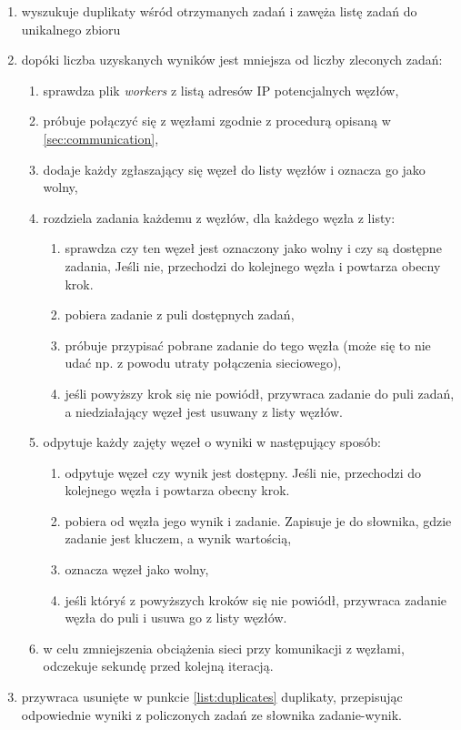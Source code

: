 \begin{enumerate}
  \item wyszukuje duplikaty wśród otrzymanych zadań i zawęża listę zadań do unikalnego zbioru\label{list:duplicates}
  \item dopóki liczba uzyskanych wyników jest mniejsza od liczby zleconych zadań:
    \begin{enumerate}
      \item sprawdza plik \textit{workers} z listą adresów IP potencjalnych węzłów,
      \item próbuje połączyć się z węzłami zgodnie z procedurą opisaną w \ref{sec:communication},
      \item dodaje każdy zgłaszający się węzeł do listy węzłów i oznacza go jako wolny,
      \item rozdziela zadania każdemu z węzłów, dla każdego węzła z listy:
        \begin{enumerate}
          \item sprawdza czy ten węzeł jest oznaczony jako wolny i czy są dostępne zadania,
                Jeśli nie, przechodzi do kolejnego węzła i powtarza obecny krok.
          \item pobiera zadanie z puli dostępnych zadań,
          \item próbuje przypisać pobrane zadanie do tego węzła (może się to nie udać np. z powodu utraty połączenia sieciowego),
          \item jeśli powyższy krok się nie powiódł, przywraca zadanie do puli zadań, a niedziałający węzeł jest usuwany z listy węzłów.
        \end{enumerate}
      \item odpytuje każdy zajęty węzeł o wyniki w następujący sposób:\label{enum:second_worker_check}
      \begin{enumerate}
        \item odpytuje węzeł czy wynik jest dostępny.
              Jeśli nie, przechodzi do kolejnego węzła i powtarza obecny krok.
        \item pobiera od węzła jego wynik i zadanie. Zapisuje je do słownika, gdzie zadanie jest kluczem, a wynik wartością,
        \item oznacza węzeł jako wolny,
        \item jeśli któryś z powyższych kroków się nie powiódł, przywraca zadanie węzła do puli i usuwa go z listy węzłów.
      \end{enumerate}
      \item w celu zmniejszenia obciążenia sieci przy komunikacji z węzłami, odczekuje sekundę przed kolejną iteracją.
    \end{enumerate}
  \item przywraca usunięte w punkcie \ref{list:duplicates} duplikaty, przepisując odpowiednie wyniki z policzonych zadań ze słownika zadanie-wynik.
\end{enumerate}

